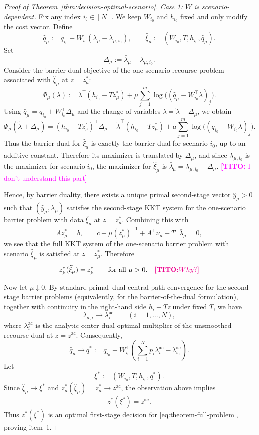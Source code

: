 \documentclass{article}
\newcommand{\thc}[1]{\textcolor{magenta}{\textbf{[TITO:} #1\textbf{]}}}
\theoremstyle{plain}
\theoremstyle{definition}
\theoremstyle{remark}
\begin{document}
\begin{proof}[Proof of Theorem~\ref{thm:decision-optimal-scenario}]
\medskip
\noindent\textit{Case 1: $W$ is scenario-dependent.}
Fix any index $i_0\in[N]$. We keep $W_{i_0}$ and $h_{i_0}$ fixed and only modify the cost vector. Define
\[
\widehat q_\mu:=q_{i_0}+W_{i_0}^\top(\bar\lambda_\mu-\lambda_{\mu,i_0}),
\qquad
\widehat\xi_\mu:=(W_{i_0},T,h_{i_0},\widehat q_\mu).
\]
Set
\[
\Delta_\mu:=\bar\lambda_\mu-\lambda_{\mu,i_0}.
\]
Consider the barrier dual objective of the one-scenario recourse problem associated with $\widehat\xi_\mu$ at $z=z_\mu^*$:
\[
\Phi_\mu(\lambda)
:=
\lambda^\top(h_{i_0}-Tz_\mu^*)
+
\mu\sum_{j=1}^m \log\!\big((\widehat q_\mu-W_{i_0}^\top\lambda)_j\big).
\]
Using $\widehat q_\mu=q_{i_0}+W_{i_0}^\top\Delta_\mu$ and the change of variables $\lambda=\widetilde\lambda+\Delta_\mu$, we obtain
\[
\Phi_\mu(\widetilde\lambda+\Delta_\mu)
=
(h_{i_0}-Tz_\mu^*)^\top\Delta_\mu
+
\widetilde\lambda^\top(h_{i_0}-Tz_\mu^*)
+
\mu\sum_{j=1}^m \log\!\big((q_{i_0}-W_{i_0}^\top\widetilde\lambda)_j\big).
\]
Thus the barrier dual for $\widehat\xi_\mu$ is exactly the barrier dual for scenario $i_0$, up to an additive constant. Therefore its maximizer is translated by $\Delta_\mu$, and since $\lambda_{\mu,i_0}$ is the maximizer for scenario $i_0$, the maximizer for $\widehat\xi_\mu$ is $\bar\lambda_\mu=\lambda_{\mu,i_0}+\Delta_\mu$. \thc{I don't understand this part}

Hence, by barrier duality, there exists a unique primal second-stage vector $\widehat y_\mu>0$ such that $(\widehat y_\mu,\bar\lambda_\mu)$ satisfies the second-stage KKT system for the one-scenario barrier problem with data $\widehat\xi_\mu$ at $z=z_\mu^*$. Combining this with
\[
Az_\mu^*=b,
\qquad
c-\mu (z_\mu^*)^{-1}+A^\top \nu_\mu-T^\top \bar\lambda_\mu=0,
\]
we see that the full KKT system of the one-scenario barrier problem with scenario $\widehat\xi_\mu$ is satisfied at $z=z_\mu^*$. Therefore
\[
z_\mu^*(\widehat\xi_\mu)=z_\mu^*
\qquad\text{for all }\mu>0.
\quad \thc{Why?}
\]

Now let $\mu\downarrow 0$. By standard primal--dual central-path convergence for the second-stage barrier problems (equivalently, for the barrier-of-the-dual formulation), together with continuity in the right-hand side $h_i-Tz$ under fixed $T$, we have
\[
\lambda_{\mu,i}\longrightarrow \lambda_i^{\mathrm{ac}}
\qquad (i=1,\dots,N),
\]
where $\lambda_i^{\mathrm{ac}}$ is the analytic-center dual-optimal multiplier of the unsmoothed recourse dual at $z=z^{\mathrm{ac}}$. Consequently,
\[
\widehat q_\mu\longrightarrow q^*
:=
q_{i_0}
+
W_{i_0}^\top\!\left(\sum_{i=1}^N p_i\lambda_i^{\mathrm{ac}}-\lambda_{i_0}^{\mathrm{ac}}\right).
\]
Let
\[
\xi^*:=(W_{i_0},T,h_{i_0},q^*).
\]
Since $\widehat\xi_\mu\to \xi^*$ and $z_\mu^*(\widehat\xi_\mu)=z_\mu^*\to z^{\mathrm{ac}}$, the observation above implies
\[
z^*(\xi^*)=z^{\mathrm{ac}}.
\]
Thus $z^*(\xi^*)$ is an optimal first-stage decision for \eqref{eq:theorem-full-problem}, proving item~1.


\end{proof}
\end{document}
